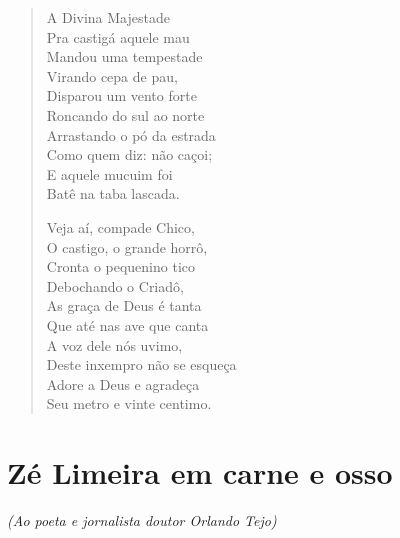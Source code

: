\begin{verse}
A Divina Majestade\\
Pra castigá aquele mau\\
Mandou uma tempestade\\
Virando cepa de pau,\\
Disparou um vento forte\\
Roncando do sul ao norte\\
Arrastando o pó da estrada\\
Como quem diz: não caçoi;\\
E aquele mucuim foi\\
Batê na taba lascada.

Veja aí, compade Chico,\\
O castigo, o grande horrô,\\
Cronta o pequenino tico\\
Debochando o Criadô,\\
As graça de Deus é tanta\\
Que até nas ave que canta\\
A voz dele nós uvimo,\\
Deste inxempro não se esqueça\\
Adore a Deus e agradeça\\
Seu metro e vinte centimo.
\end{verse}

\chapter{Zé Limeira em carne e osso}

\begin{flushright}
\emph{(Ao poeta e jornalista doutor Orlando Tejo)}
\end{flushright}

